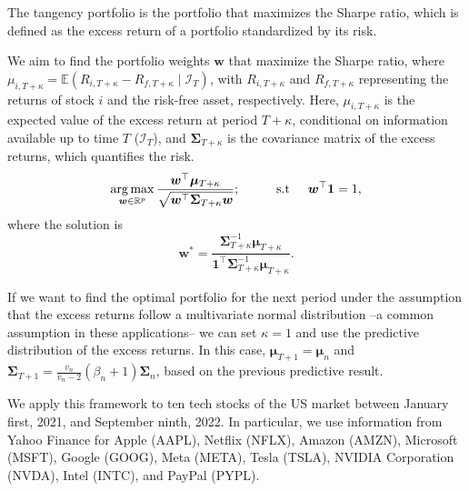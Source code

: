 \begin{enumerate}
The tangency portfolio is the portfolio that maximizes the Sharpe ratio, which is defined as the excess return of a portfolio standardized by its risk.

We aim to find the portfolio weights \( \bm{w} \) that maximize the Sharpe ratio, where \( \mu_{i,T+\kappa} = \mathbb{E}\left( R_{i,T+\kappa} - R_{f,T+\kappa} \mid \mathcal{I}_T \right) \), with \( R_{i,T+\kappa} \) and \( R_{f,T+\kappa} \) representing the returns of stock \( i \) and the risk-free asset, respectively. Here, \( \mu_{i,T+\kappa} \) is the expected value of the excess return at period \( T+\kappa \), conditional on information available up to time \( T \) (\( \mathcal{I}_T \)), and \( \bm{\Sigma}_{T+\kappa} \) is the covariance matrix of the excess returns, which quantifies the risk.
\begin{equation*}
	\operatorname*{arg\,max}_{{\bm w}\in \mathbb{R}^{p}} \frac{{\bm w}^{\top}\bm{\mu}_{T+\kappa}}{\sqrt{{\bm w}^{\top}{\bm{\Sigma}}_{T+\kappa} {\bm w}}}; \hspace{1cm} \text{s.t}\hspace{.5cm} {\bm w}^{\top}{\bm{1}}=1,
\end{equation*}
where the solution is
\begin{equation*}
	{\bm w}^*=\frac{{\bm{\Sigma}}^{-1}_{T+\kappa}\bm{\mu}_{T+\kappa}}{{\bm{1}}^{\top}{\bm \Sigma}^{-1}_{T+\kappa}\bm{\mu}_{T+\kappa}}.
\end{equation*}

If we want to find the optimal portfolio for the next period under the assumption that the excess returns follow a multivariate normal distribution --a common assumption in these applications-- we can set \( \kappa = 1 \) and use the predictive distribution of the excess returns. In this case, \( \bm{\mu}_{T+1} = \bm{\mu}_n \) and \( \bm{\Sigma}_{T+1} = \frac{v_n}{v_n - 2} (\beta_n + 1) \bm{\Sigma}_n \), based on the previous predictive result.

We apply this framework to ten tech stocks of the US market between January first, 2021, and September ninth, 2022. In particular, we use information from Yahoo Finance for Apple (AAPL), Netflix (NFLX), Amazon (AMZN), Microsoft (MSFT), Google (GOOG), Meta (META), Tesla (TSLA), NVIDIA Corporation (NVDA), Intel (INTC), and PayPal (PYPL).


\end{enumerate}
